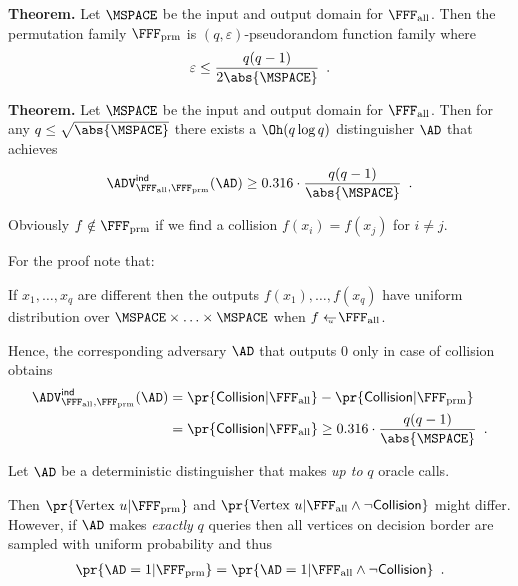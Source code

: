 \documentclass[landscape,footrule]{foils}
\begin{document}

\textbf{Theorem.}  Let $\MSPACE$ be the input and output domain for
$\FFFALL$. Then the permutation family $\FFFPERM$ is
$(q,\varepsilon)$-pseudorandom function family where
\begin{align*}
  \varepsilon\leq\frac{q(q-1)}{2\abs{\MSPACE}}\enspace.
\end{align*}

\textbf{Theorem.}  Let $\MSPACE$ be the input and output domain for
$\FFFALL$. Then for any $q\leq \sqrt{\abs{\MSPACE}}$ there exists a
$\Oh(q\log q)$ distinguisher $\AD$ that achieves
\begin{align*}
  \advIndXX{\FFFALL,\FFFPERM}{\AD}\geq 0.316\cdot
  \frac{q(q-1)}{\abs{\MSPACE}}\enspace.
\end{align*}


Obviously $f\notin \FFFPERM$ if we find a collision $f(x_i)=f(x_j)$
for $i\neq j$. 

For the proof note that:
\begin{triangles}
\item If $x_1,\ldots, x_q$ are different then the outputs
  $f(x_1),\ldots, f(x_q)$ have uniform distribution over
  $\MSPACE\times\ldots\times\MSPACE$ when $f\getsu\FFFALL$.
\item Hence, the corresponding adversary $\AD$ that outputs $0$ only
  in case of collision obtains
  \begin{align*}
    \advIndXX{\FFFALL,\FFFPERM}{\AD}%
    &=\pr{\mathsf{Collision}|\FFFALL}-\pr{\mathsf{Collision}|\FFFPERM}\\
    &=\pr{\mathsf{Collision}|\FFFALL}\geq 0.316\cdot
    \frac{q(q-1)}{\abs{\MSPACE}}\enspace.
  \end{align*}
\end{triangles}


Let $\AD$ be a deterministic distinguisher that makes \emph{up to}
$q$ oracle calls.

Then $\pr{\text{Vertex } u|\FFFPERM}$ and $\pr{\text{Vertex }
  u|\FFFALL\wedge \neg\mathsf{Collision}}$ might differ.  However, if
$\AD$ makes \emph{exactly} $q$ queries then all vertices on decision
border are sampled with uniform probability and thus
\begin{align*}
  \pr{\AD=1|\FFFPERM}=\pr{\AD=1|\FFFALL\wedge  \neg\mathsf{Collision}}\enspace.
\end{align*}
\end{document}
